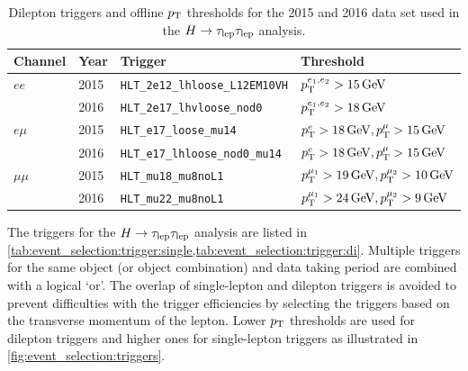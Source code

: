 \begin{table}[htpb]
    \centering
    \caption{Dilepton triggers and offline $p_\text{T}$ thresholds for the 2015 and 2016 data set used in the $H \to \tau_\text{lep} \tau_\text{lep}$ analysis.}\label{tab:event_selection:trigger:di}
    \begin{tabular}{@{}llll@{}}
        \toprule
        Channel  & Year & Trigger & Threshold \\ \midrule
        $ee$     & 2015 & \texttt{HLT\_2e12\_lhloose\_L12EM10VH} & $\pt^{e_1, e_2} > \SI{15}{\GeV}$ \\
                 & 2016 & \texttt{HLT\_2e17\_lhvloose\_nod0} & $\pt^{e_1, e_2} > \SI{18}{\GeV}$ \\ \cmidrule{1-4}
        $e\mu$   & 2015 & \texttt{HLT\_e17\_loose\_mu14} & $\pt^{e} > \SI{18}{\GeV}, \pt^\mu > \SI{15}{\GeV}$ \\
                 & 2016 & \texttt{HLT\_e17\_lhloose\_nod0\_mu14} & $\pt^{e} > \SI{18}{\GeV}, \pt^\mu > \SI{15}{\GeV}$ \\ \cmidrule{1-4}
        $\mu\mu$ & 2015 & \texttt{HLT\_mu18\_mu8noL1} & $\pt^{\mu_1} > \SI{19}{\GeV}, \pt^{\mu_2} > \SI{10}{\GeV}$ \\
                 & 2016 & \texttt{HLT\_mu22\_mu8noL1} & $\pt^{\mu_1} > \SI{24}{GeV}, \pt^{\mu_2} > \SI{9}{\GeV}$ \\
        \bottomrule
    \end{tabular}
\end{table}

The triggers for the $H \to \tau_\text{lep} \tau_\text{lep}$ analysis are listed in \cref{tab:event_selection:trigger:single,tab:event_selection:trigger:di}.
Multiple triggers for the same object (or object combination) and data taking period are combined with a logical `or'.
The overlap of single-lepton and dilepton triggers is avoided to prevent difficulties with the trigger efficiencies
by selecting the triggers based on the transverse momentum of the lepton.
Lower $p_\text{T}$ thresholds are used for dilepton triggers and higher ones for single-lepton triggers as
illustrated in \cref{fig:event_selection:triggers}.

